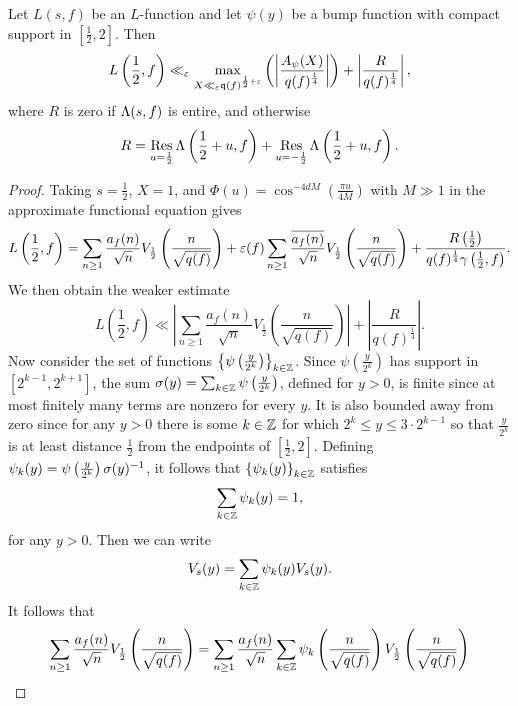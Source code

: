     \begin{theorem}
      Let $L(s,f)$ be an $L$-function and let $\psi(y)$ be a bump function with compact support in $\left[\frac{1}{2},2\right]$. Then
      \[
        L\left(\frac{1}{2},f\right) \ll_{\varepsilon} \max_{X \ll_{\varepsilon} \mathfrak{q}(f)^{\frac{1}{2}+\varepsilon}}\left(\left|\frac{A_{\psi}(X)}{q(f)^{\frac{1}{4}}}\right|\right)+\left|\frac{R}{q(f)^{\frac{1}{4}}}\right|,
      \]
      where $R$ is zero if $\Lambda(s,f)$ is entire, and otherwise
      \[
        R = \operatorname*{\mathrm{Res}}_{u = \frac{1}{2}}\Lambda\left(\frac{1}{2}+u,f\right)+\operatorname*{\mathrm{Res}}_{u = -\frac{1}{2}}\Lambda\left(\frac{1}{2}+u,f\right).
      \]
    \end{theorem}
    \begin{proof}
      Taking $s = \frac{1}{2}$, $X = 1$, and $\Phi(u) = \cos^{-4dM}\left(\frac{\pi u}{4M}\right)$ with $M \gg 1$ in the approximate functional equation gives
      \[
        L\left(\frac{1}{2},f\right) = \sum_{n \ge 1}\frac{a_{f}(n)}{\sqrt{n}}V_{\frac{1}{2}}\left(\frac{n}{\sqrt{q(f)}}\right)+\varepsilon(f)\sum_{n \ge 1}\frac{\overline{a_{f}(n)}}{\sqrt{n}}V_{\frac{1}{2}}\left(\frac{n}{\sqrt{q(f)}}\right)+\frac{R\left(\frac{1}{2}\right)}{q(f)^{\frac{1}{4}}\gamma\left(\frac{1}{2},f\right)}.
      \]
      We then obtain the weaker estimate
      \[
        L\left(\frac{1}{2},f\right) \ll \left|\sum_{n \ge 1}\frac{a_{f}(n)}{\sqrt{n}}V_{\frac{1}{2}}\left(\frac{n}{\sqrt{q(f)}}\right)\right|+\left|\frac{R}{q(f)^{\frac{1}{4}}}\right|.
      \]
      Now consider the set of functions $\left\{\psi\left(\frac{y}{2^{k}}\right)\right\}_{k \in \mathbb{Z}}$. Since $\psi\left(\frac{y}{2^{k}}\right)$ has support in $[2^{k-1},2^{k+1}]$, the sum $\sigma(y) = \sum_{k \in \mathbb{Z}}\psi\left(\frac{y}{2^{k}}\right)$, defined for $y > 0$, is finite since at most finitely many terms are nonzero for every $y$. It is also bounded away from zero since for any $y > 0$ there is some $k \in \mathbb{Z}$ for which $2^{k} \le y \le 3 \cdot 2^{k-1}$ so that $\frac{y}{2^{k}}$ is at least distance $\frac{1}{2}$ from the endpoints of $\left[\frac{1}{2},2\right]$. Defining $\psi_{k}(y) = \psi\left(\frac{y}{2^{k}}\right)\sigma(y)^{-1}$, it follows that $\left\{\psi_{k}(y)\right\}_{k \in \mathbb{Z}}$ satisfies
      \[
        \sum_{k \in \mathbb{Z}}\psi_{k}(y) = 1,
      \]
      for any $y > 0$. Then we can write
      \[
        V_{s}(y) = \sum_{k \in \mathbb{Z}}\psi_{k}(y)V_{s}(y).
      \]
      It follows that
      \begin{align*}
        \sum_{n \ge 1}\frac{a_{f}(n)}{\sqrt{n}}V_{\frac{1}{2}}\left(\frac{n}{\sqrt{q(f)}}\right) &= \sum_{n \ge 1}\frac{a_{f}(n)}{\sqrt{n}}\sum_{k \in \Z}\psi_{k}\left(\frac{n}{\sqrt{q(f)}}\right)V_{\frac{1}{2}}\left(\frac{n}{\sqrt{q(f)}}\right) \\

\end{align*}
\end{proof}
